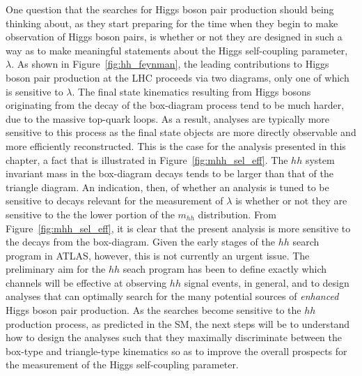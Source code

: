 One question that the searches for Higgs boson pair production should being thinking about,
as they start preparing for the time when they begin to make observation of Higgs boson pairs,
is whether or not they are designed in such a way as to make meaningful statements about the
Higgs self-coupling parameter, $\lambda$.
As shown in Figure~\ref{fig:hh_feynman}, the leading contributions to Higgs boson pair production
at the LHC proceeds via two diagrams, only one of which is sensitive to $\lambda$.
The final state kinematics resulting from Higgs bosons originating from the decay of the box-diagram
process tend to be much harder, due to the massive top-quark loops.
As a result, analyses are typically more sensitive to this process as the final state objects are
more directly observable and more efficiently reconstructed.
This is the case for the analysis presented in this chapter, a fact that is illustrated in Figure~\ref{fig:mhh_sel_eff}.
The $hh$ system invariant mass in the box-diagram decays
tends to be larger than that of the triangle diagram.
An indication, then, of whether an analysis is tuned to be sensitive to decays relevant
for the measurement of $\lambda$ is whether or not they are sensitive to the the lower portion of the $m_{hh}$ distribution.
From Figure~\ref{fig:mhh_sel_eff}, it is clear that the present analysis is more sensitive to the decays from the box-diagram.
Given the early stages of the $hh$ search program in ATLAS, however, this is not currently
an urgent issue.
The preliminary aim for the $hh$ seach program has been to define exactly which channels will be effective
at observing $hh$ signal events, in general, and to design analyses that can optimally search
for the many potential sources of \textit{enhanced} Higgs boson pair production.
As the searches become sensitive to the $hh$ production process, as predicted in the SM,
the next steps will be to understand how to design the analyses such that they maximally
discriminate between the box-type and triangle-type kinematics so as to improve the overall prospects
for the measurement of the Higgs self-coupling parameter.

